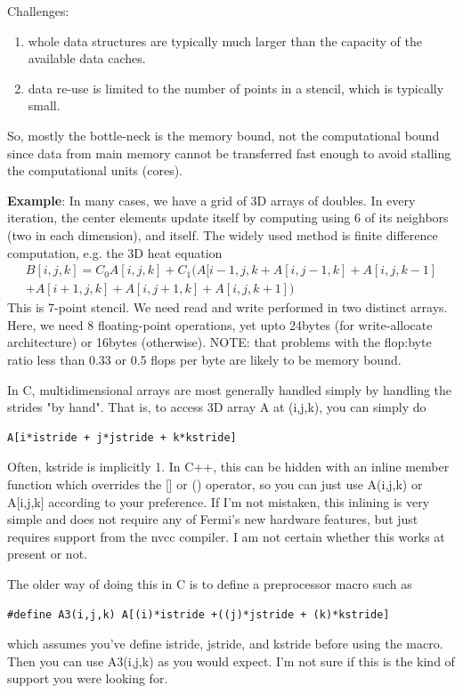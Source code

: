 Challenges:
\begin{enumerate}
\item whole data structures are typically much larger than the
  capacity of the available data caches.
\item data re-use is limited to the number of points in a stencil,
  which is typically small. 
\end{enumerate}
So, mostly the bottle-neck is the memory bound, not the computational
bound since data from main memory cannot be transferred fast enough to
avoid stalling the computational units (cores). 


{\bf Example}: In many cases, we have a grid of 3D arrays of
doubles. In every iteration, the center elements update itself by
computing using 6 of its neighbors (two in each dimension), and
itself. The widely used method is finite difference computation,
e.g. the 3D heat equation
\begin{equation}
  \label{eq:7}
  \begin{split}
    B[i,j,k] = C_0A[i,j,k] + C_1(A[i-1,j,k+A[i,j-1,k]+A[i,j,k-1] \\
    + A[i+1,j,k]+A[i,j+1,k]+A[i,j,k+1])
  \end{split}
\end{equation}
This is 7-point stencil. We need read and write performed in two
distinct arrays. Here, we need 8 floating-point operations, yet upto
24bytes (for write-allocate architecture) or 16bytes
(otherwise). NOTE: that problems with the flop:byte ratio less than
0.33 or 0.5 flops per byte are likely to be memory bound. 

In C, multidimensional arrays are most generally handled simply by handling the strides "by hand".  That is, to access 3D array A at (i,j,k), you can simply do

\begin{verbatim}
A[i*istride + j*jstride + k*kstride] 
\end{verbatim}

Often, kstride is implicitly 1.  In C++, this can be hidden with an
inline member function which overrides the [] or () operator, so you
can just use A(i,j,k) or A[i,j,k] according to your preference.  If
I'm not mistaken, this inlining is very simple and does not require
any of Fermi's new hardware features, but just requires support from
the nvcc compiler.  I am not certain whether this works at present or
not.

The older way of doing this in C is to define a preprocessor macro
such as
\begin{verbatim}
#define A3(i,j,k) A[(i)*istride +((j)*jstride + (k)*kstride] 
\end{verbatim}
which assumes you've define istride, jstride, and kstride before using
the macro.  Then you can use A3(i,j,k) as you would expect.  I'm not
sure if this is the kind of support you were looking for.

